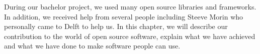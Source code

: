 During our bachelor project, we used many open source libraries and frameworks. In addition, we received help from several people including Steeve Morin who personally came to Delft to help us. In this chapter, we will describe our contribution to the world of open source software, explain what we have achieved and what we have done to make software people can use.